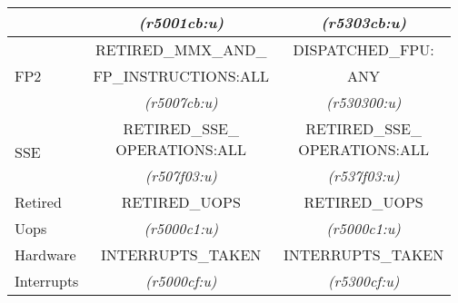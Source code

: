 \begin{tabular}{|l||c|c|}
                      &
{\em (r5001cb:u)}     & %
{\em (r5303cb:u)}    \\ %

\hline
\multirow{3}{*}{\parbox{0.5in}{FP2}}     &  
RETIRED\_MMX\_AND\_                       & %
DISPATCHED\_FPU:                        \\ %

               &  
FP\_INSTRUCTIONS:ALL         & %
ANY            \\ %

                      &
{\em (r5007cb:u)}     & %
{\em (r530300:u)}    \\ %

\hline
\multirow{3}{*}{\parbox{0.5in}{SSE}}   & 
\multirow{2}{*}{\parbox{1.2in}{\centering RETIRED\_SSE\_\\OPERATIONS:ALL}} & %
\multirow{2}{*}{\parbox{1.2in}{\centering RETIRED\_SSE\_\\OPERATIONS:ALL}} \\ %

			&
                           & %
                          \\ %

                      &
{\em (r507f03:u)}    & %
{\em (r537f03:u)}    \\ %


\hline
Retired               &  
RETIRED\_UOPS        & %
RETIRED\_UOPS         \\ %

Uops                  &
{\em (r5000c1:u)}     & %
{\em (r5000c1:u)}    \\ %

\hline
Hardware                 &  
INTERRUPTS\_TAKEN        & %
INTERRUPTS\_TAKEN       \\ %

Interrupts            &
{\em (r5000cf:u)}     & %
{\em (r5300cf:u)}    \\ %

\hline

\end{tabular}
